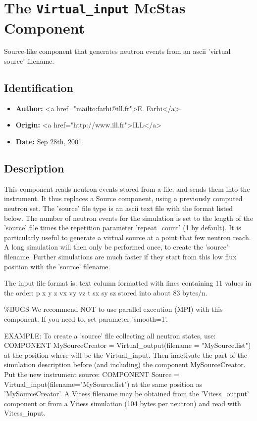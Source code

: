 \section{The \texttt{Virtual\_input} McStas Component}
Source-like component that generates neutron events from an ascii
'virtual source' filename.

\subsection*{Identification}
\begin{itemize}
  \item \textbf{Author:} \textless{}a href="mailto:farhi@ill.fr"\textgreater{}E. Farhi\textless{}/a\textgreater{}
  \item \textbf{Origin:} \textless{}a href="http://www.ill.fr"\textgreater{}ILL\textless{}/a\textgreater{}
  \item \textbf{Date:} Sep 28th, 2001
\end{itemize}

\subsection*{Description}
This component reads neutron events stored from a file, and sends them into the instrument. It thus replaces a Source component, using a previously computed neutron set. The 'source' file type is an ascii text file with the format listed below. The number of neutron events for the simulation is set to the length of the 'source' file times the repetition parameter 'repeat\_count' (1 by default). It is particularly useful to generate a virtual source at a point that few neutron reach. A long simulation will then only be performed once, to create the 'source' filename. Further simulations are much faster if they start from this low flux position with the 'source' filename.

The input file format is: text column formatted with lines containing 11 values in the order: p x y z vx vy vz t sx sy sz stored into about 83 bytes/n.

\%BUGS We recommend NOT to use parallel execution (MPI) with this component. If you need to, set parameter 'smooth=1'.

EXAMPLE: To create a 'source' file collecting all neutron states, use: COMPONENT MySourceCreator = Virtual\_output(filename = "MySource.list") at the position where will be the Virtual\_input. Then inactivate the part of the simulation description before (and including) the component MySourceCreator. Put the new instrument source: COMPONENT Source = Virtual\_input(filename="MySource.list") at the same position as 'MySourceCreator'. A Vitess filename may be obtained from the 'Vitess\_output' component or from a Vitess simulation (104 bytes per neutron) and read with Vitess\_input.

